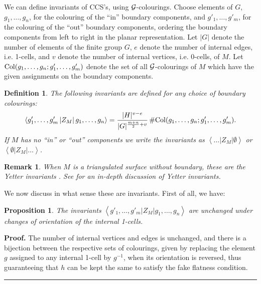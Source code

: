 \documentclass[a4paper,11pt]{article}
\newtheorem{Definition}[Theorem]{Definition}
\newtheorem{Proposition}[Theorem]{Proposition}
\newtheorem{Remark}[Theorem]{Remark}
\newenvironment{Proof}[1][Proof]{\textbf{#1.} }{\ \rule{0.5em}{0.5em}}
\begin{document}
We can define invariants of CCS's, using $\cal G$-colourings. Choose elements of $G$, $g_1,\dots , g_n$, for the colouring of the ``in'' boundary components, and 
$g'_1,\dots , g'_m$, for the colouring of the ``out'' boundary components, ordering the boundary components from left to right in the planar representation. 
Let  $|G|$ denote the number of elements of the finite group $G$, $e$ denote the number of internal edges, i.e. 1-cells, and $v$ denote the number of internal vertices, i.e. 0-cells, of $M$. 
Let ${\rm Col}(g_1,\dots , g_n; g'_1,\dots , g'_m)$ denote the set of all $\cal G$-colourings of $M$ which have the given assignments on the boundary components.

\begin{Definition} The following invariants are defined for any choice of boundary colourings:
\begin{equation}
\left \langle g'_1,\dots , g'_m \left | Z_M \right |g_1,\dots , g_n   \right \rangle = \frac{|H|^{v-e}}{|G|^{\frac{m+n}{2}+v}} \, \# {\rm Col}(g_1,\dots , g_n; g'_1,\dots , g'_m).
\label{def:Z2grp}
\end{equation}
% 
If $M$ has no ``in'' or ``out'' components we write the invariants as  $\left \langle {} \dots {} \left | Z_M \right |\emptyset  \right \rangle$ or $\left \langle \emptyset \left | Z_M \right | \dots    \right \rangle$. 
\label{def:2grpinv}
\end{Definition}

\begin{Remark}
When $M$ is a triangulated surface without boundary, these are the Yetter invariants \cite{yetter}. See \cite{FMPo} for an in-depth discussion of Yetter invariants.
\end{Remark}



\vskip 0.2cm
We now discuss in what sense these are invariants. First of all, we have:

\begin{Proposition}
The invariants $\left \langle g'_1,\dots , g'_m \left | Z_M \right |g_1,\dots , g_n   \right \rangle$ are unchanged under changes of orientation of the  internal 1-cells.
\label{prop:orientn}
\end{Proposition}
%
\begin{Proof} The number of internal vertices and edges is unchanged, and there is a bijection between the respective sets of colourings, given by replacing the element $g$ assigned to any  internal 1-cell by $g^{-1}$, when its orientation is reversed, thus guaranteeing that $h$ can be kept the same to satisfy the fake flatness condition.
\end{Proof}
\vskip 0.2cm
\end{document}
